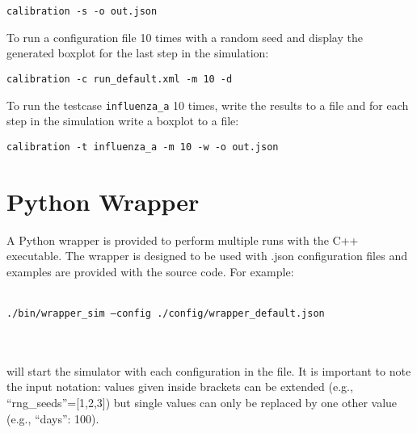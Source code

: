 \centerline{\texttt{calibration -s -o out.json}}

To run a configuration file 10 times with a random seed and display the generated boxplot for the last step in the simulation:\\

\centerline{\texttt{calibration -c run\_default.xml -m 10 -d}}

To run the testcase \texttt{influenza\_a} 10 times, write the results to a file and for each step in the simulation write a boxplot to a file:\\

\centerline{\texttt{calibration -t influenza\_a -m 10 -w -o out.json}}



\section{Python Wrapper}
A Python wrapper is provided to perform multiple runs with the C++ executable.
The wrapper is designed to be used with .json configuration files and examples are provided with the source code.
For example: \\ \\
\centerline{\texttt{./bin/wrapper\_sim --config ./config/wrapper\_default.json}} \\ \\
will start the simulator with each configuration in the file.
It is important to note the input notation: values given inside brackets can be extended (e.g., ``rng\_seeds''=[1,2,3]) but single values can only be replaced by one other value (e.g., ``days'': 100).


